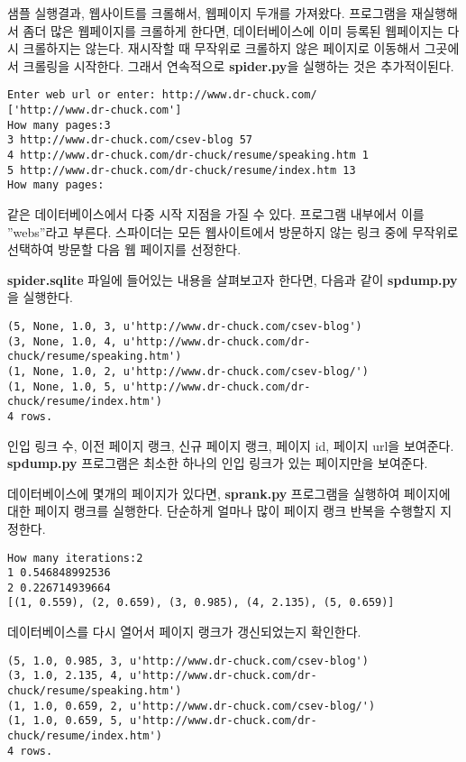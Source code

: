 샘플 실행결과, 웹사이트를 크롤해서, 웹페이지 두개를 가져왔다.
프로그램을 재실행해서 좀더 많은 웹페이지를 크롤하게 한다면, 데이터베이스에 이미 등록된 웹페이지는 다시 크롤하지는 않는다.
재시작할 때 무작위로 크롤하지 않은 페이지로 이동해서 그곳에서 크롤링을 시작한다.
그래서 연속적으로 {\bf spider.py}을 실행하는 것은 추가적이된다.

\beforeverb
\begin{verbatim}
Enter web url or enter: http://www.dr-chuck.com/
['http://www.dr-chuck.com']
How many pages:3
3 http://www.dr-chuck.com/csev-blog 57
4 http://www.dr-chuck.com/dr-chuck/resume/speaking.htm 1
5 http://www.dr-chuck.com/dr-chuck/resume/index.htm 13
How many pages:
\end{verbatim}
\afterverb
%

같은 데이터베이스에서 다중 시작 지점을 가질 수 있다.
프로그램 내부에서 이를 ''webs''라고 부른다.
스파이더는 모든 웹사이트에서 방문하지 않는 링크 중에 무작위로 선택하여 방문할 다음 웹 페이지를 선정한다. 

{\bf spider.sqlite} 파일에 들어있는 내용을 살펴보고자 한다면, 다음과 같이 {\bf spdump.py}을 실행한다.

\beforeverb
\begin{verbatim}
(5, None, 1.0, 3, u'http://www.dr-chuck.com/csev-blog')
(3, None, 1.0, 4, u'http://www.dr-chuck.com/dr-chuck/resume/speaking.htm')
(1, None, 1.0, 2, u'http://www.dr-chuck.com/csev-blog/')
(1, None, 1.0, 5, u'http://www.dr-chuck.com/dr-chuck/resume/index.htm')
4 rows.
\end{verbatim}
\afterverb
%

인입 링크 수, 이전 페이지 랭크, 신규 페이지 랭크, 페이지 id, 페이지 url을 보여준다.
{\bf spdump.py} 프로그램은 최소한 하나의 인입 링크가 있는 페이지만을 보여준다.

데이터베이스에 몇개의 페이지가 있다면, {\bf sprank.py} 프로그램을 실행하여 페이지에 대한 페이지 랭크를 실행한다. 
단순하게 얼마나 많이 페이지 랭크 반복을 수행할지 지정한다.

\beforeverb
\begin{verbatim}
How many iterations:2
1 0.546848992536
2 0.226714939664
[(1, 0.559), (2, 0.659), (3, 0.985), (4, 2.135), (5, 0.659)]
\end{verbatim}
\afterverb
%

데이터베이스를 다시 열어서 페이지 랭크가 갱신되었는지 확인한다.

\beforeverb
\begin{verbatim}
(5, 1.0, 0.985, 3, u'http://www.dr-chuck.com/csev-blog')
(3, 1.0, 2.135, 4, u'http://www.dr-chuck.com/dr-chuck/resume/speaking.htm')
(1, 1.0, 0.659, 2, u'http://www.dr-chuck.com/csev-blog/')
(1, 1.0, 0.659, 5, u'http://www.dr-chuck.com/dr-chuck/resume/index.htm')
4 rows.
\end{verbatim}
\afterverb
%

